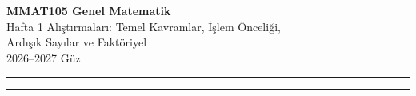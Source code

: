 \documentclass[11pt,a4paper]{article}
\newcounter{alis}
\begin{document}
\begin{minipage}[c]{\textwidth}
{\LARGE\bfseries\color{anamavi} MMAT105 Genel Matematik}\\[4pt]
{\large Hafta 1 Alıştırmaları: Temel Kavramlar, İşlem Önceliği,\\ Ardışık Sayılar ve Faktöriyel}\\[6pt]
{\small 2026--2027 Güz}
\end{minipage}

\vspace{4pt}\noindent\textcolor{anamavi}{\rule{\textwidth}{1pt}}



\vspace{6pt}
\noindent\textcolor{anamavi}{\rule{\textwidth}{0.5pt}}\\
{\small }
\end{document}

